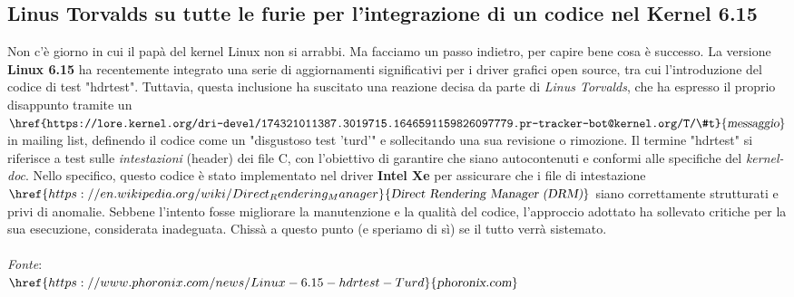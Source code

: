 \documentclass[a4paper,twoside]{article}
\begin{document}
\subsection{Linus Torvalds su tutte le furie per l'integrazione di un codice nel Kernel 6.15}
Non c'è giorno in cui il papà del kernel Linux non si arrabbi. Ma facciamo un passo indietro, per capire bene cosa è successo. La versione \textbf{Linux 6.15} ha recentemente integrato una serie di aggiornamenti significativi per i driver grafici open source, tra cui l'introduzione del codice di test "hdrtest". Tuttavia, questa inclusione ha suscitato una reazione decisa da parte di \textit{Linus Torvalds}, che ha espresso il proprio disappunto tramite un $\href{https://lore.kernel.org/dri-devel/174321011387.3019715.1646591159826097779.pr-tracker-bot@kernel.org/T/\#t}{\textsl{messaggio}}$ in mailing list, definendo il codice come un "disgustoso test 'turd'" e sollecitando una sua revisione o rimozione. Il termine "hdrtest" si riferisce a test sulle \textit{intestazioni} (header) dei file C, con l'obiettivo di garantire che siano autocontenuti e conformi alle specifiche del \textsl{kernel-doc}. Nello specifico, questo codice è stato implementato nel driver \textbf{Intel Xe} per assicurare che i file di intestazione \textit{$\href{https://en.wikipedia.org/wiki/Direct_Rendering_Manager}{\textsl{Direct Rendering Manager (DRM)}}$} siano correttamente strutturati e privi di anomalie. Sebbene l'intento fosse migliorare la manutenzione e la qualità del codice, l'approccio adottato ha sollevato critiche per la sua esecuzione, considerata inadeguata. Chissà a questo punto (e speriamo di sì) se il tutto verrà sistemato.\\
\\
\textit{Fonte}:\\
$\href{https://www.phoronix.com/news/Linux-6.15-hdrtest-Turd}{\textsl{phoronix.com}}$
\end{document}
